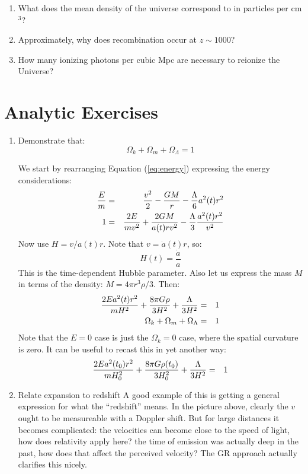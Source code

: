 \begin{enumerate} 
\item What does the mean density of the universe correspond to in
    particles per cm$^3$?
\item Approximately, why does recombination occur at $z\sim 1000$?
\item How many ionizing photons per cubic Mpc are necessary to
reionize the Universe?
\end{enumerate} 

\section{Analytic Exercises}

\begin{enumerate}
\item Demonstrate that:
\begin{equation}
\Omega_k + \Omega_m + \Omega_\Lambda = 1
\end{equation}
\begin{answer}
We start by rearranging Equation (\ref{eq:energy}) expressing the
energy considerations:
\begin{eqnarray}
\frac{E}{m} &=& \frac{v^2}{2}-\frac{GM}{r} - \frac{\Lambda}{6}a^2(t)r^2 \cr
1 &=& \frac{2E}{mv^2} + \frac{2GM}{a(t) rv^2} -
\frac{\Lambda}{3}\frac{a^2(t) r^2}{v^2} 
\end{eqnarray}
Now use $H=v/a(t)r$. Note that $v={\dot a}(t) r$, so:
\begin{equation}
H(t) = \frac{\dot a}{a}
\end{equation}
This is the time-dependent Hubble parameter. Also let us express the
mass $M$ in terms of the density: $M=4\pi r^3\rho/3$. Then:
\begin{eqnarray}
\frac{2Ea^2(t) r^2}{mH^2} + \frac{8\pi
  G\rho}{3H^2}+\frac{\Lambda}{3H^2} &=& 1 \cr 
\Omega_k + \Omega_m + \Omega_\Lambda &=& 1
\end{eqnarray}
Note that the $E=0$ case is just the $\Omega_k=0$ case, where the
spatial curvature is zero. It can be useful to recast this in yet
another way:
\begin{eqnarray}
\frac{2Ea^2(t_0) r^2}{mH_0^2} + \frac{8\pi
  G\rho(t_0)}{3H_0^2}+\frac{\Lambda}{3H^2} &=& 1 \cr 
\end{eqnarray}
\end{answer}
\item Relate expansion to redshift
A good example of this is getting a general expression for what the
``redshift'' means. In the picture above, clearly the $v$ ought to be
measureable with a Doppler shift. But for large distances it becomes
complicated: the velocities can become close to the speed of light,
how does relativity apply here? the time of emission was actually deep
in the past, how does that affect the perceived velocity? The GR
approach actually clarifies this nicely.


\end{enumerate}
